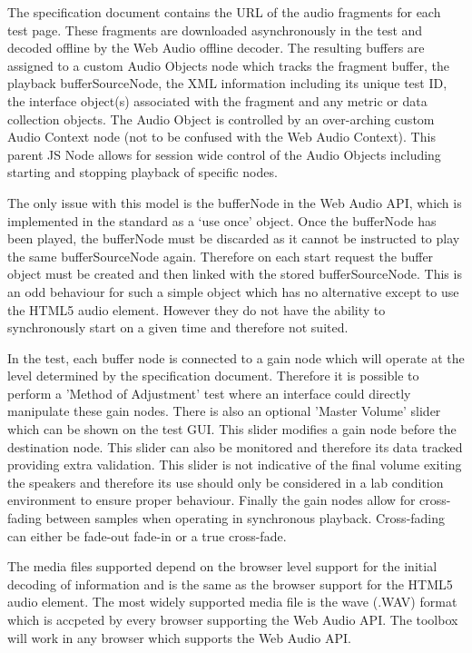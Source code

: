 \documentclass{sig-alternate}
\begin{document}
    The specification document contains the URL of the audio fragments for each test page. These fragments are downloaded asynchronously in the test and decoded offline by the Web Audio offline decoder. The resulting buffers are assigned to a custom Audio Objects node which tracks the fragment buffer, the playback bufferSourceNode, the XML information including its unique test ID, the interface object(s) associated with the fragment and any metric or data collection objects. The Audio Object is controlled by an over-arching custom Audio Context node (not to be confused with the Web Audio Context). This parent JS Node allows for session wide control of the Audio Objects including starting and stopping playback of specific nodes.
    
    The only issue with this model is the bufferNode in the Web Audio API, which is implemented in the standard as a `use once' object. Once the bufferNode has been played, the bufferNode must be discarded as it cannot be instructed to play the same bufferSourceNode again. Therefore on each start request the buffer object must be created and then linked with the stored bufferSourceNode. This is an odd behaviour for such a simple object which has no alternative except to use the HTML5 audio element. However they do not have the ability to synchronously start on a given time and therefore not suited.
    
    In the test, each buffer node is connected to a gain node which will operate at the level determined by the specification document. Therefore it is possible to perform a 'Method of Adjustment' test where an interface could directly manipulate these gain nodes. There is also an optional 'Master Volume' slider which can be shown on the test GUI. This slider modifies a gain node before the destination node. This slider can also be monitored and therefore its data tracked providing extra validation. This slider is not indicative of the final volume exiting the speakers and therefore its use should only be considered in a lab condition environment to ensure proper behaviour. Finally the gain nodes allow for cross-fading between samples when operating in synchronous playback. Cross-fading can either be fade-out fade-in or a true cross-fade.
    
    The media files supported depend on the browser level support for the initial decoding of information and is the same as the browser support for the HTML5 audio element. The most widely supported media file is the wave (.WAV) format which is accpeted by every browser supporting the Web Audio API. The toolbox will work in any browser which supports the Web Audio API.
    
\end{document}
